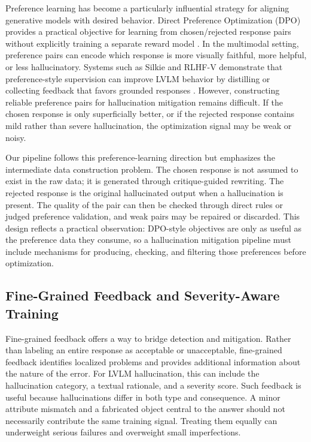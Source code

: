 \documentclass{article}
\begin{document}
Preference learning has become a particularly influential strategy for aligning generative models with desired behavior. Direct Preference Optimization (DPO) provides a practical objective for learning from chosen/rejected response pairs without explicitly training a separate reward model \citep{rafailov2024dpo}. In the multimodal setting, preference pairs can encode which response is more visually faithful, more helpful, or less hallucinatory. Systems such as Silkie and RLHF-V demonstrate that preference-style supervision can improve LVLM behavior by distilling or collecting feedback that favors grounded responses \citep{li2023silkie,yu2024rlhfv}. However, constructing reliable preference pairs for hallucination mitigation remains difficult. If the chosen response is only superficially better, or if the rejected response contains mild rather than severe hallucination, the optimization signal may be weak or noisy.

Our pipeline follows this preference-learning direction but emphasizes the intermediate data construction problem. The chosen response is not assumed to exist in the raw data; it is generated through critique-guided rewriting. The rejected response is the original hallucinated output when a hallucination is present. The quality of the pair can then be checked through direct rules or judged preference validation, and weak pairs may be repaired or discarded. This design reflects a practical observation: DPO-style objectives are only as useful as the preference data they consume, so a hallucination mitigation pipeline must include mechanisms for producing, checking, and filtering those preferences before optimization.

\subsection{Fine-Grained Feedback and Severity-Aware Training}

Fine-grained feedback offers a way to bridge detection and mitigation. Rather than labeling an entire response as acceptable or unacceptable, fine-grained feedback identifies localized problems and provides additional information about the nature of the error. For LVLM hallucination, this can include the hallucination category, a textual rationale, and a severity score. Such feedback is useful because hallucinations differ in both type and consequence. A minor attribute mismatch and a fabricated object central to the answer should not necessarily contribute the same training signal. Treating them equally can underweight serious failures and overweight small imperfections.
\end{document}
